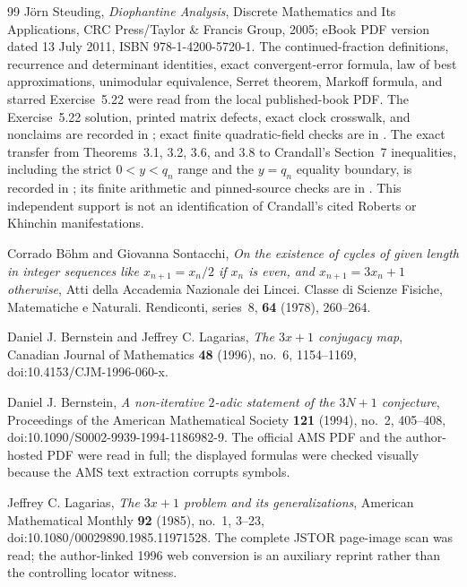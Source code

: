 \begin{thebibliography}{99}
J\"orn Steuding,
\emph{Diophantine Analysis},
Discrete Mathematics and Its Applications, CRC Press/Taylor \& Francis
Group, 2005; eBook PDF version dated 13 July 2011,
ISBN 978-1-4200-5720-1.  The continued-fraction definitions, recurrence and
determinant identities, exact convergent-error formula, law of best
approximations, unimodular equivalence, Serret theorem, Markoff formula, and
starred Exercise~5.22 were read from the local published-book PDF.  The
Exercise~5.22 solution, printed matrix defects, exact clock crosswalk, and
nonclaims are recorded in
; exact finite
quadratic-field checks are in
.  The exact transfer from
Theorems~3.1, 3.2, 3.6, and 3.8 to Crandall's Section~7 inequalities, including
the strict $0<y<q_n$ range and the $y=q_n$ equality boundary, is recorded in
; its finite
arithmetic and pinned-source checks are in
.  This independent
support is not an identification of Crandall's cited Roberts or Khinchin
manifestations.

Corrado B\"ohm and Giovanna Sontacchi,
\emph{On the existence of cycles of given length in integer sequences like
$x_{n+1}=x_n/2$ if $x_n$ is even, and $x_{n+1}=3x_n+1$ otherwise},
Atti della Accademia Nazionale dei Lincei. Classe di Scienze Fisiche,
Matematiche e Naturali. Rendiconti, series~8, \textbf{64} (1978), 260--264.

Daniel J. Bernstein and Jeffrey C. Lagarias,
\emph{The $3x+1$ conjugacy map},
Canadian Journal of Mathematics \textbf{48} (1996), no.~6, 1154--1169,
doi:10.4153/CJM-1996-060-x.

Daniel J. Bernstein,
\emph{A non-iterative $2$-adic statement of the $3N+1$ conjecture},
Proceedings of the American Mathematical Society \textbf{121} (1994),
no.~2, 405--408, doi:10.1090/S0002-9939-1994-1186982-9.  The official AMS
PDF and the author-hosted PDF were read in full; the displayed formulas were
checked visually because the AMS text extraction corrupts symbols.

Jeffrey C. Lagarias,
\emph{The $3x+1$ problem and its generalizations},
American Mathematical Monthly \textbf{92} (1985), no.~1, 3--23,
doi:10.1080/00029890.1985.11971528.  The complete JSTOR page-image scan was
read; the author-linked 1996 web conversion is an auxiliary reprint rather
than the controlling locator witness.


\end{thebibliography}
